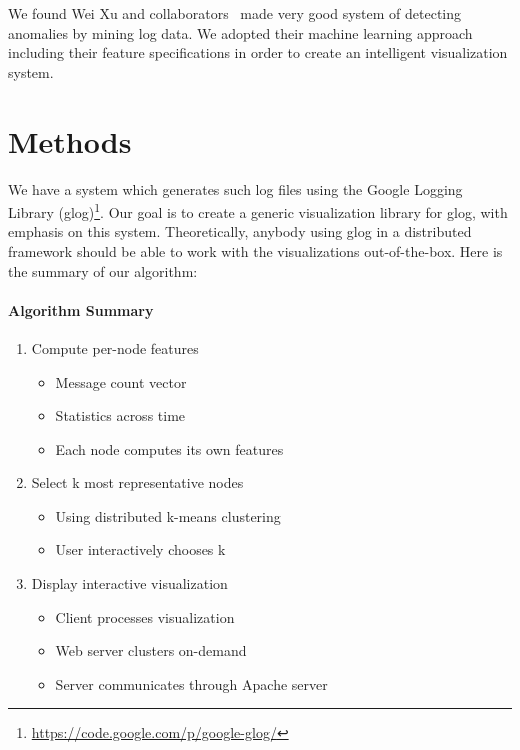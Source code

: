 \documentclass[conference]{acmsiggraph}
\begin{document}
We found Wei Xu and collaborators~\cite{Xu09} made very good system of detecting anomalies by mining
log data. We adopted their machine learning approach including their feature specifications in order
to create an intelligent visualization system.

\section{Methods}

We have a system which generates such log files using the Google Logging Library
(glog)\footnote{\url{https://code.google.com/p/google-glog/}}. Our goal is to create a generic
visualization library for glog, with emphasis on this system. Theoretically, anybody using glog in a
distributed framework should be able to work with the visualizations out-of-the-box. Here is the
summary of our algorithm:

\paragraph{Algorithm Summary}
\begin{enumerate}
    \item Compute per-node features
        \begin{itemize}
            \item Message count vector
            \item Statistics across time
            \item Each node computes its own features
        \end{itemize}
    \item Select k most representative nodes
        \begin{itemize}
            \item Using distributed k-means clustering
            \item User interactively chooses k
        \end{itemize}
    \item Display interactive visualization
        \begin{itemize}
            \item Client processes visualization
            \item Web server clusters on-demand
            \item Server communicates through Apache server
        \end{itemize}
\end{enumerate}
\end{document}
